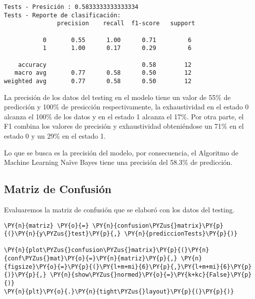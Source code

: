     \begin{Verbatim}[commandchars=\\\{\}]
Tests - Presición : 0.5833333333333334
Tests - Reporte de clasificación:
               precision    recall  f1-score   support

           0       0.55      1.00      0.71         6
           1       1.00      0.17      0.29         6

    accuracy                           0.58        12
   macro avg       0.77      0.58      0.50        12
weighted avg       0.77      0.58      0.50        12

    \end{Verbatim}

    La precisión de los datos del testing en el modelo tiene un valor de 55\% de predicción y 100\% de presicción respectivamente, la exhaustividad en el estado 0 alcanza el 100\% de los datos y en el estado 1 alcanza el 17\%.  Por otra parte, el F1 combina los valores de precisión y exhaustividad obteniéndose un 71\% en el estado 0 y un 29\% en el estado 1. 

Lo que se busca es la precisión del modelo, por consecuencia, el Algoritmo de Machine Learning Naïve Bayes tiene una precisión del 58.3\% de predicción.

    \hypertarget{matriz-de-confusiuxf3n}{%
\subsection{Matriz de Confusión}\label{matriz-de-confusiuxf3n}}

Evaluaremos la matriz de confusión que se elaboró con los datos del
testing.

    \begin{tcolorbox}[breakable, size=fbox, boxrule=1pt, pad at break*=1mm,colback=cellbackground, colframe=cellborder]
\begin{Verbatim}[commandchars=\\\{\}]
\PY{n}{matriz} \PY{o}{=} \PY{n}{confusion\PYZus{}matrix}\PY{p}{(}\PY{n}{y\PYZus{}test}\PY{p}{,} \PY{n}{prediccionTests}\PY{p}{)}

\PY{n}{plot\PYZus{}confusion\PYZus{}matrix}\PY{p}{(}\PY{n}{conf\PYZus{}mat}\PY{o}{=}\PY{n}{matriz}\PY{p}{,} \PY{n}{figsize}\PY{o}{=}\PY{p}{(}\PY{l+m+mi}{6}\PY{p}{,}\PY{l+m+mi}{6}\PY{p}{)}\PY{p}{,} \PY{n}{show\PYZus{}normed}\PY{o}{=}\PY{k+kc}{False}\PY{p}{)}
\PY{n}{plt}\PY{o}{.}\PY{n}{tight\PYZus{}layout}\PY{p}{(}\PY{p}{)}
\end{Verbatim}
\end{tcolorbox}

